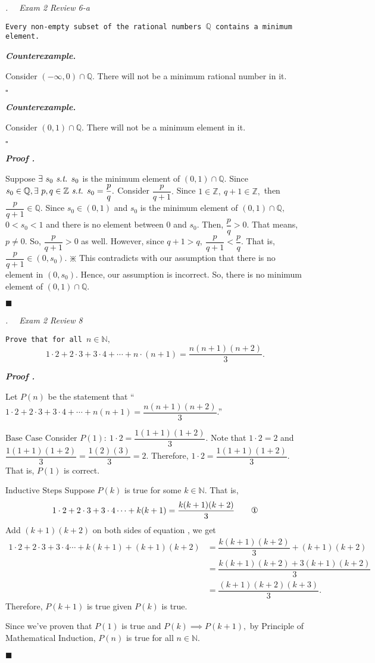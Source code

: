 \documentclass[11pt,letter]{article}
\newcounter{nq}[section]
\newcounter{np}[section]
\newenvironment*{p}{\par\noindent\textbf{\textit{Proof \stepcounter{np}\thenp. }}\par}{\par\hfill $\blacksquare$\par}
\newenvironment*{q}[1]{\noindent\emph{\thesection.\stepcounter{nq}\thenq$\quad $ #1}\par\noindent\texttt}{}
\newenvironment*{counter}{\par\noindent\textbf{\textit{Counterexample\stepcounter{np}\thenp. }}\par}{\par\hfill $\square$\par}
\def\Z{{\mathbb{Z}}}
\def\Q{{\mathbb{Q}}}
\def\N{{\mathbb{N}}}
\def\st{\emph{ s.t. }}
\begin{document}
\begin{framed}\begin{q}
	{Exam 2 Review 6-a}
	{Every non-empty subset of the rational numbers $\Q$ contains a minimum element.}
\end{q}\end{framed}
\begin{counter}
	Consider $(-\infty,0)\cap\Q$. There will not be a minimum rational number in it.
\end{counter}
\begin{counter}
	Consider $(0,1)\cap\Q.$ There will not be a minimum element in it.	
\end{counter}
\begin{p}
	Suppose $\exists\ s_0\st s_0$ is the minimum element of $(0,1)\cap\Q.$ Since $s_0\in\Q,\exists\ p,q\in\Z\st s_0=\dfrac{p}{q}.$ Consider $\dfrac{p}{q+1}.$ Since $1\in\Z,\ q+1\in\Z,$ then $\dfrac{p}{q+1}\in\Q.$ Since $s_0\in(0,1)$ and $s_0$ is the minimum element of $(0,1)\cap\Q,$ $0<s_0<1$ and there is no element between $0$ and $s_0.$ Then, $\dfrac{p}{q}>0.$ That means, $p\neq0.$ So, $\dfrac{p}{q+1}>0$ as well. However, since $q+1>q,\ \dfrac{p}{q+1}<\dfrac{p}{q}.$ That is, $\dfrac{p}{q+1}\in(0,s_0).$ $\divideontimes$ This contradicts with our assumption that there is no element in $(0,s_0).$ Hence, our assumption is incorrect. So, there is no minimum element of $(0,1)\cap\Q.$
\end{p}

\begin{framed}\begin{q}
	{Exam 2 Review 8}
	{Prove that for all $n\in\N,$ \[1\cdot2+2\cdot3+3\cdot4+\cdots+n\cdot(n+1)=\dfrac{n(n+1)(n+2)}{3}.\]}
\end{q}\end{framed}
\begin{p}
	Let $P(n)$ be the statement that ``$1\cdot2+2\cdot3+3\cdot4+\cdots+n(n+1)=\dfrac{n(n+1)(n+2)}{3}$.''\par 
	$\boxed{\text{Base Case}}$ Consider $P(1):\ 1\cdot2=\dfrac{1(1+1)(1+2)}{3}.$  Note that $1\cdot2=2$ and $\dfrac{1(1+1)(1+2)}{3}=\dfrac{1(2)(3)}{3}=2.$ Therefore, $1\cdot2=\dfrac{1(1+1)(1+2)}{3}.$ That is, $P(1)$ is correct.\par 
	$\boxed{\text{Inductive Steps}}$ Suppose $P(k)$ is true for some $k\in\N.$ That is, \[1\cdot2+2\cdot3+3\cdot4\cdots+k(k+1)=\dfrac{k(k+1)(k+2)}{3}\qquad\text{\ding{172}}\] Add $(k+1)(k+2)$ on both sides of equation , we get \[\begin{aligned}1\cdot2+2\cdot3+3\cdot4\cdots+k(k+1)+(k+1)(k+2)&=\dfrac{k(k+1)(k+2)}{3}+(k+1)(k+2)\\&=\dfrac{k(k+1)(k+2)+3(k+1)(k+2)}{3}\\&=\dfrac{(k+1)(k+2)(k+3)}{3}.\end{aligned}\] Therefore, $P(k+1)$ is true given $P(k)$ is true.\par 
	Since we've proven that $P(1)$ is true and $P(k)\implies P(k+1),$ by Principle of Mathematical Induction, $P(n)$ is true for all $n\in\N.$
\end{p}
\end{document}
